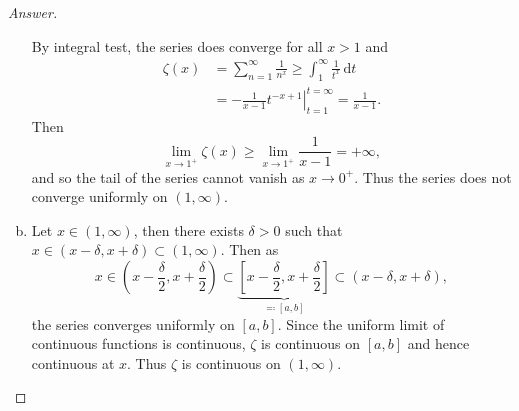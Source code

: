 \documentclass[12pt]{article}
\newcommand\paren[1]{\left( #1 \right)}
\newcommand{\sqbrack}[1]{\left [ #1 \right ]}
\renewcommand{\i}[4]{\int_{#1}^{#2} {#3} \, \mathrm{d} {#4} }
\theoremstyle{definition}
\begin{document}
\begin{proof}[Answer]
\begin{enumerate}[(a)]
        By integral test, the series does converge for all $x > 1$ and 
        \begin{align*}
            \zeta(x) & = \sum\limits_{n = 1}^{\infty} \frac{1}{n^x} \geq \i{1}{\infty}{\frac{1}{t^x}}{t} \\ 
            & = \left. - \frac{1}{x - 1} t^{-x+1} \right|_{t = 1}^{t = \infty} = \frac{1}{x - 1} . 
        \end{align*}
        Then 
        \[
            \lim\limits_{x \to 1^+} \zeta(x) \geq \lim\limits_{x \to 1^+} \frac{1}{x - 1} = +\infty , 
        \]
        and so the tail of the series cannot vanish as $x \to 0^+$. Thus the series does not converge uniformly on $(1,\infty)$. 
        \item Let $x \in (1,\infty)$, then there exists $\delta > 0$ such that $x \in (x - \delta , x + \delta) \subset (1,\infty)$. Then as 
        \[
            x \in \paren{ x - \frac{\delta}{2} , x + \frac{\delta}{2} } \subset \underbrace{ \sqbrack{ x - \frac{\delta}{2} , x + \frac{\delta}{2} } }_{\eqqcolon [a,b]} \subset (x - \delta , x + \delta) , 
        \]
        the series converges uniformly on $[a,b]$. Since the uniform limit of continuous functions is continuous, $\zeta$ is continuous on $[a,b]$ and hence continuous at $x$. Thus $\zeta$ is continuous on $(1,\infty)$. 
    \end{enumerate}
\end{proof}
\end{document}
